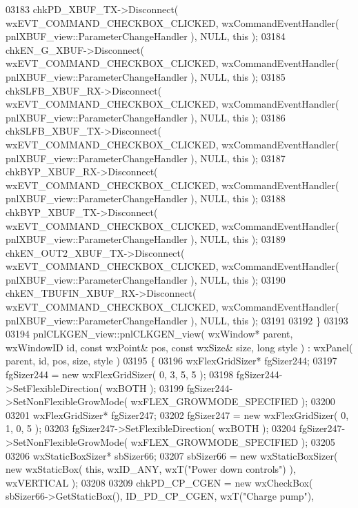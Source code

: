 \begin{DoxyCode}
03183     chkPD_XBUF_TX->Disconnect( wxEVT\_COMMAND\_CHECKBOX\_CLICKED, wxCommandEventHandler( 
      pnlXBUF_view::ParameterChangeHandler ), NULL, \textcolor{keyword}{this} );
03184     chkEN_G_XBUF->Disconnect( wxEVT\_COMMAND\_CHECKBOX\_CLICKED, wxCommandEventHandler( 
      pnlXBUF_view::ParameterChangeHandler ), NULL, \textcolor{keyword}{this} );
03185     chkSLFB_XBUF_RX->Disconnect( wxEVT\_COMMAND\_CHECKBOX\_CLICKED, wxCommandEventHandler( 
      pnlXBUF_view::ParameterChangeHandler ), NULL, \textcolor{keyword}{this} );
03186     chkSLFB_XBUF_TX->Disconnect( wxEVT\_COMMAND\_CHECKBOX\_CLICKED, wxCommandEventHandler( 
      pnlXBUF_view::ParameterChangeHandler ), NULL, \textcolor{keyword}{this} );
03187     chkBYP_XBUF_RX->Disconnect( wxEVT\_COMMAND\_CHECKBOX\_CLICKED, wxCommandEventHandler( 
      pnlXBUF_view::ParameterChangeHandler ), NULL, \textcolor{keyword}{this} );
03188     chkBYP_XBUF_TX->Disconnect( wxEVT\_COMMAND\_CHECKBOX\_CLICKED, wxCommandEventHandler( 
      pnlXBUF_view::ParameterChangeHandler ), NULL, \textcolor{keyword}{this} );
03189     chkEN_OUT2_XBUF_TX->Disconnect( wxEVT\_COMMAND\_CHECKBOX\_CLICKED, wxCommandEventHandler( 
      pnlXBUF_view::ParameterChangeHandler ), NULL, \textcolor{keyword}{this} );
03190     chkEN_TBUFIN_XBUF_RX->Disconnect( wxEVT\_COMMAND\_CHECKBOX\_CLICKED, wxCommandEventHandler( 
      pnlXBUF_view::ParameterChangeHandler ), NULL, \textcolor{keyword}{this} );
03191     
03192 \}
03193 
03194 pnlCLKGEN_view::pnlCLKGEN_view( wxWindow* parent, wxWindowID \textcolor{keywordtype}{id}, \textcolor{keyword}{const} wxPoint& pos, \textcolor{keyword}{const} wxSize& 
      size, \textcolor{keywordtype}{long} style ) : wxPanel( parent, id, pos, size, style )
03195 \{
03196     wxFlexGridSizer* fgSizer244;
03197     fgSizer244 = \textcolor{keyword}{new} wxFlexGridSizer( 0, 3, 5, 5 );
03198     fgSizer244->SetFlexibleDirection( wxBOTH );
03199     fgSizer244->SetNonFlexibleGrowMode( wxFLEX\_GROWMODE\_SPECIFIED );
03200     
03201     wxFlexGridSizer* fgSizer247;
03202     fgSizer247 = \textcolor{keyword}{new} wxFlexGridSizer( 0, 1, 0, 5 );
03203     fgSizer247->SetFlexibleDirection( wxBOTH );
03204     fgSizer247->SetNonFlexibleGrowMode( wxFLEX\_GROWMODE\_SPECIFIED );
03205     
03206     wxStaticBoxSizer* sbSizer66;
03207     sbSizer66 = \textcolor{keyword}{new} wxStaticBoxSizer( \textcolor{keyword}{new} wxStaticBox( \textcolor{keyword}{this}, wxID\_ANY, wxT(\textcolor{stringliteral}{"Power down controls"}) ), 
      wxVERTICAL );
03208     
03209     chkPD_CP_CGEN = \textcolor{keyword}{new} wxCheckBox( sbSizer66->GetStaticBox(), ID_PD_CP_CGEN, wxT(\textcolor{stringliteral}{"Charge pump"}), 

\end{DoxyCode}
